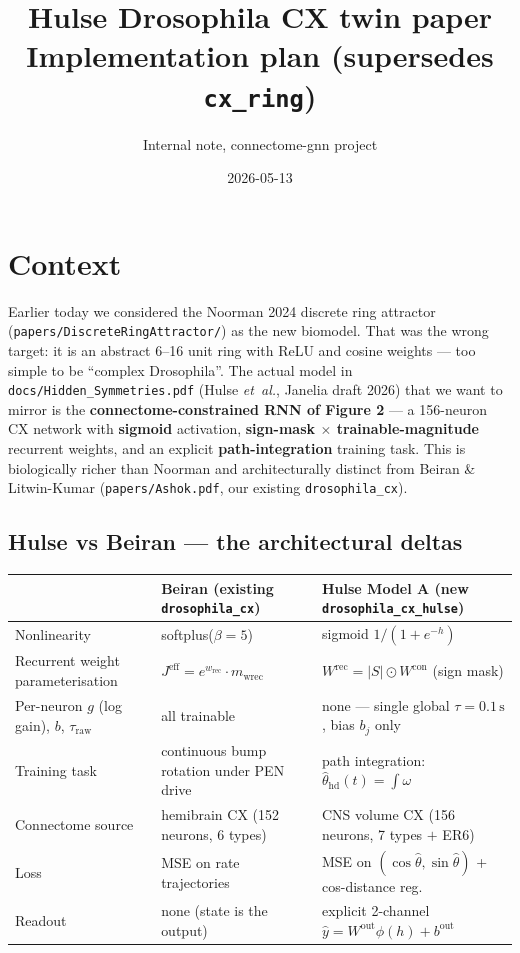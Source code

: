 \documentclass[11pt]{article}
\title{Hulse Drosophila CX twin paper\\ \large Implementation plan (supersedes \texttt{cx\_ring})}
\author{Internal note, connectome-gnn project}
\date{2026-05-13}
\begin{document}
\maketitle

\section*{Context}

Earlier today we considered the Noorman 2024 discrete ring attractor
(\texttt{papers/DiscreteRingAttractor/}) as the new biomodel. That was the
wrong target: it is an abstract 6--16 unit ring with ReLU and cosine
weights --- too simple to be ``complex Drosophila''. The actual model
in \texttt{docs/Hidden\_Symmetries.pdf} (Hulse \textit{et~al.}, Janelia
draft 2026) that we want to mirror is the
\textbf{connectome-constrained RNN of Figure 2} --- a 156-neuron CX
network with \textbf{sigmoid} activation, \textbf{sign-mask $\times$
trainable-magnitude} recurrent weights, and an explicit
\textbf{path-integration} training task. This is biologically richer than
Noorman and architecturally distinct from Beiran \& Litwin-Kumar
(\texttt{papers/Ashok.pdf}, our existing \texttt{drosophila\_cx}).

\subsection*{Hulse vs Beiran --- the architectural deltas}

\begin{center}
\small
\begin{tabular}{lll}
\toprule
                                     & \textbf{Beiran (existing \texttt{drosophila\_cx})} & \textbf{Hulse Model A (new \texttt{drosophila\_cx\_hulse})} \\
\midrule
Nonlinearity                         & softplus($\beta=5$)                              & sigmoid $1/(1+e^{-h})$ \\
Recurrent weight parameterisation    & $J^{\text{eff}} = e^{w_{\text{rec}}}\cdot m_{\text{wrec}}$ & $W^{\text{rec}} = |S|\odot W^{\text{con}}$ (sign mask) \\
Per-neuron $g$ (log gain), $b$, $\tau_{\text{raw}}$ & all trainable                          & none --- single global $\tau=0.1\,\text{s}$, bias $b_j$ only \\
Training task                        & continuous bump rotation under PEN drive          & path integration: $\hat\theta_{\text{hd}}(t) = \int\!\omega$ \\
Connectome source                    & hemibrain CX (152 neurons, 6 types)              & CNS volume CX (156 neurons, 7 types $+$ ER6) \\
Loss                                 & MSE on rate trajectories                          & MSE on $(\cos\hat\theta, \sin\hat\theta)$ + cos-distance reg.\ \\
Readout                              & none (state is the output)                        & explicit 2-channel $\hat{y}=W^{\text{out}}\phi(h)+b^{\text{out}}$ \\
\bottomrule
\end{tabular}
\end{center}
\end{document}
